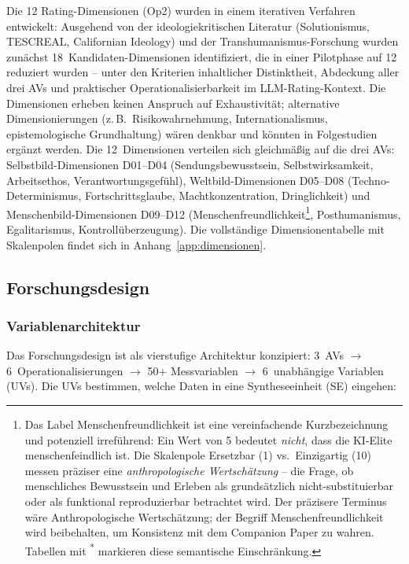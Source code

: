 \documentclass[12pt,a4paper]{article}
\begin{document}
Die 12 Rating-Dimensionen (Op2) wurden in einem iterativen Verfahren entwickelt: Ausgehend von der ideologiekritischen Literatur (Solutionismus, TESCREAL, Californian Ideology) und der Transhumanismus-Forschung wurden zun\"achst 18~Kandidaten-Dimensionen identifiziert, die in einer Pilotphase auf 12 reduziert wurden -- unter den Kriterien inhaltlicher Distinktheit, Abdeckung aller drei AVs und praktischer Operationalisierbarkeit im LLM-Rating-Kontext. Die Dimensionen erheben keinen Anspruch auf Exhaustivit\"at; alternative Dimensionierungen (z.\,B.\ Risikowahrnehmung, Internationalismus, epistemologische Grundhaltung) w\"aren denkbar und k\"onnten in Folgestudien erg\"anzt werden. Die 12~Dimensionen verteilen sich gleichm\"a\ss{}ig auf die drei AVs: Selbstbild-Dimensionen D01--D04 (Sendungsbewusstsein, Selbstwirksamkeit, Arbeitsethos, Verantwortungsgef\"uhl), Weltbild-Dimensionen D05--D08 (Techno-Determinismus, Fortschrittsglaube, Machtkonzentration, Dringlichkeit) und Menschenbild-Dimensionen D09--D12 (Menschenfreundlichkeit\footnote{Das Label \glqq Menschenfreundlichkeit\grqq{} ist eine vereinfachende Kurzbezeichnung und potenziell irref\"uhrend: Ein Wert von 5 bedeutet \emph{nicht}, dass die KI-Elite \glqq menschenfeindlich\grqq{} ist. Die Skalenpole \glqq Ersetzbar\grqq{} (1) vs.\ \glqq Einzigartig\grqq{} (10) messen pr\"aziser eine \emph{anthropologische Wertsch\"atzung} -- die Frage, ob menschliches Bewusstsein und Erleben als grunds\"atzlich nicht-substituierbar oder als funktional reproduzierbar betrachtet wird. Der pr\"azisere Terminus w\"are \glqq Anthropologische Wertsch\"atzung\grqq; der Begriff \glqq Menschenfreundlichkeit\grqq{} wird beibehalten, um Konsistenz mit dem Companion Paper \citep{Geiger2026SWR} zu wahren. Tabellen mit \textsuperscript{*} markieren diese semantische Einschr\"ankung.}, Posthumanismus, Egalitarismus, Kontroll\"uberzeugung). Die vollst\"andige Dimensionentabelle mit Skalenpolen findet sich in Anhang~\ref{app:dimensionen}.


\subsection{Forschungsdesign}
\label{sec:methodik:design}

\subsubsection{Variablenarchitektur}

Das Forschungsdesign ist als vierstufige Architektur konzipiert: 3~AVs $\to$ 6~Operationalisierungen $\to$ 50+ Messvariablen $\to$ 6~unabh\"angige Variablen (UVs). Die UVs bestimmen, welche Daten in eine Syntheseeinheit (SE) eingehen:
\end{document}
